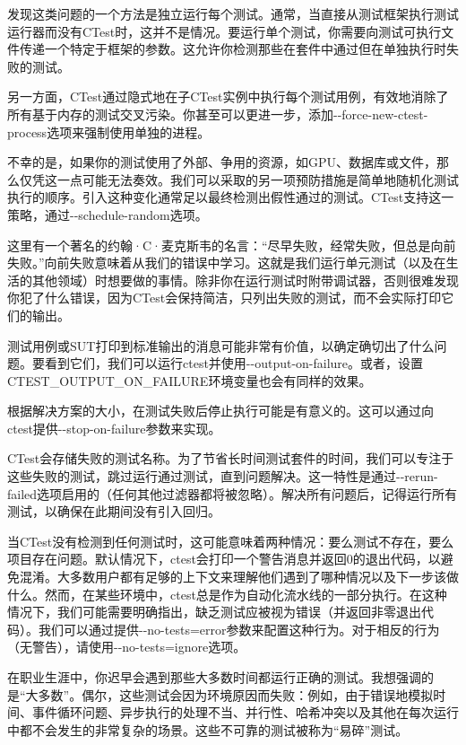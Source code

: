 发现这类问题的一个方法是独立运行每个测试。通常，当直接从测试框架执行测试运行器而没有CTest时，这并不是情况。要运行单个测试，你需要向测试可执行文件传递一个特定于框架的参数。这允许你检测那些在套件中通过但在单独执行时失败的测试。

另一方面，CTest通过隐式地在子CTest实例中执行每个测试用例，有效地消除了所有基于内存的测试交叉污染。你甚至可以更进一步，添加-{}-force-new-ctest-process选项来强制使用单独的进程。

不幸的是，如果你的测试使用了外部、争用的资源，如GPU、数据库或文件，那么仅凭这一点可能无法奏效。我们可以采取的另一项预防措施是简单地随机化测试执行的顺序。引入这种变化通常足以最终检测出假性通过的测试。CTest支持这一策略，通过-{}-schedule-random选项。


这里有一个著名的约翰·C·麦克斯韦的名言：“尽早失败，经常失败，但总是向前失败。”向前失败意味着从我们的错误中学习。这就是我们运行单元测试（以及在生活的其他领域）时想要做的事情。除非你在运行测试时附带调试器，否则很难发现你犯了什么错误，因为CTest会保持简洁，只列出失败的测试，而不会实际打印它们的输出。

测试用例或SUT打印到标准输出的消息可能非常有价值，以确定确切出了什么问题。要看到它们，我们可以运行ctest并使用-{}-output-on-failure。或者，设置CTEST\_OUTPUT\_ON\_FAILURE环境变量也会有同样的效果。

根据解决方案的大小，在测试失败后停止执行可能是有意义的。这可以通过向ctest提供-{}-stop-on-failure参数来实现。

CTest会存储失败的测试名称。为了节省长时间测试套件的时间，我们可以专注于这些失败的测试，跳过运行通过测试，直到问题解决。这一特性是通过-{}-rerun-failed选项启用的（任何其他过滤器都将被忽略）。解决所有问题后，记得运行所有测试，以确保在此期间没有引入回归。

当CTest没有检测到任何测试时，这可能意味着两种情况：要么测试不存在，要么项目存在问题。默认情况下，ctest会打印一个警告消息并返回0的退出代码，以避免混淆。大多数用户都有足够的上下文来理解他们遇到了哪种情况以及下一步该做什么。然而，在某些环境中，ctest总是作为自动化流水线的一部分执行。在这种情况下，我们可能需要明确指出，缺乏测试应被视为错误（并返回非零退出代码）。我们可以通过提供-{}-no-tests=error参数来配置这种行为。对于相反的行为（无警告），请使用-{}-no-tests=ignore选项。


在职业生涯中，你迟早会遇到那些大多数时间都运行正确的测试。我想强调的是“大多数”。偶尔，这些测试会因为环境原因而失败：例如，由于错误地模拟时间、事件循环问题、异步执行的处理不当、并行性、哈希冲突以及其他在每次运行中都不会发生的非常复杂的场景。这些不可靠的测试被称为“易碎”测试。

